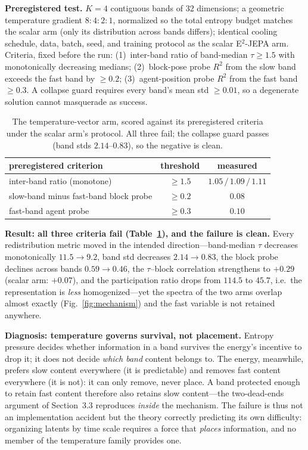 \documentclass[11pt]{article}
\begin{document}
\textbf{Preregistered test.} $K{=}4$ contiguous bands of 32 dimensions; a geometric temperature gradient $8{:}4{:}2{:}1$, normalized so the total entropy budget matches the scalar arm (only its distribution across bands differs); identical cooling schedule, data, batch, seed, and training protocol as the scalar E$^2$-JEPA arm. Criteria, fixed before the run: (1)~inter-band ratio of band-median $\tau \ge 1.5$ with monotonically decreasing medians; (2)~block-pose probe $R^2$ from the slow band exceeds the fast band by $\ge 0.2$; (3)~agent-position probe $R^2$ from the fast band $\ge 0.3$. A collapse guard requires every band's mean std $\ge 0.01$, so a degenerate solution cannot masquerade as success.

\begin{table}[t]
\centering
\begin{tabular}{lcc}
\hline
preregistered criterion & threshold & measured \\
\hline
inter-band ratio (monotone) & $\ge 1.5$ & $1.05\,/\,1.09\,/\,1.11$ \\
slow-band minus fast-band block probe & $\ge 0.2$ & $0.08$ \\
fast-band agent probe & $\ge 0.3$ & $0.10$ \\
\hline
\end{tabular}
\caption{The temperature-vector arm, scored against its preregistered criteria under the scalar arm's protocol. All three fail; the collapse guard passes (band stds $2.14$--$0.83$), so the negative is clean.}
\label{tab:tv}
\end{table}

\textbf{Result: all three criteria fail (Table~\ref{tab:tv}), and the failure is clean.} Every redistribution metric moved in the intended direction---band-median $\tau$ decreases monotonically $11.5 \to 9.2$, band std decreases $2.14 \to 0.83$, the block probe declines across bands $0.59 \to 0.46$, the $\tau$--block correlation strengthens to $+0.29$ (scalar arm: $+0.07$), and the participation ratio drops from $114.5$ to $45.7$, i.e.\ the representation is \emph{less} homogenized---yet the spectra of the two arms overlap almost exactly (Fig.~\ref{fig:mechanism}) and the fast variable is not retained anywhere.

\textbf{Diagnosis: temperature governs survival, not placement.} Entropy pressure decides whether information in a band survives the energy's incentive to drop it; it does not decide \emph{which band} content belongs to. The energy, meanwhile, prefers slow content everywhere (it is predictable) and removes fast content everywhere (it is not): it can only remove, never place. A band protected enough to retain fast content therefore also retains slow content---the two-dead-ends argument of Section~3.3 reproduces \emph{inside} the mechanism. The failure is thus not an implementation accident but the theory correctly predicting its own difficulty: organizing latents by time scale requires a force that \emph{places} information, and no member of the temperature family provides one.
\end{document}
